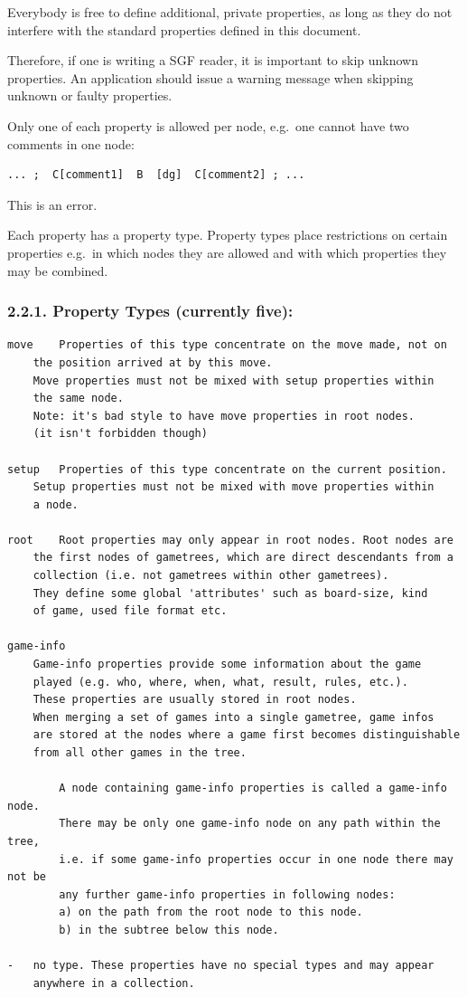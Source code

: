 Everybody is free to define additional, private properties, as long as
they do not interfere with the standard properties defined in this
document.

Therefore, if one is writing a SGF reader, it is important to skip
unknown properties. An application should issue a warning message when
skipping unknown or faulty properties.

Only one of each property is allowed per node, e.g.~one cannot have two
comments in one node:

\begin{verbatim}
... ;  C[comment1]  B  [dg]  C[comment2] ; ...
\end{verbatim}

This is an error.

Each property has a property type. Property types place restrictions on
certain properties e.g.~in which nodes they are allowed and with which
properties they may be combined.

\subsubsection{2.2.1. Property Types (currently
five):}\label{property-types-currently-five}

\begin{verbatim}
move    Properties of this type concentrate on the move made, not on
    the position arrived at by this move.
    Move properties must not be mixed with setup properties within
    the same node.
    Note: it's bad style to have move properties in root nodes.
    (it isn't forbidden though)

setup   Properties of this type concentrate on the current position.
    Setup properties must not be mixed with move properties within
    a node.

root    Root properties may only appear in root nodes. Root nodes are
    the first nodes of gametrees, which are direct descendants from a
    collection (i.e. not gametrees within other gametrees).
    They define some global 'attributes' such as board-size, kind
    of game, used file format etc.

game-info
    Game-info properties provide some information about the game
    played (e.g. who, where, when, what, result, rules, etc.).
    These properties are usually stored in root nodes.
    When merging a set of games into a single gametree, game infos
    are stored at the nodes where a game first becomes distinguishable
    from all other games in the tree.

        A node containing game-info properties is called a game-info node.
        There may be only one game-info node on any path within the tree,
        i.e. if some game-info properties occur in one node there may not be
        any further game-info properties in following nodes:
        a) on the path from the root node to this node.
        b) in the subtree below this node.

-   no type. These properties have no special types and may appear
    anywhere in a collection.
\end{verbatim}

